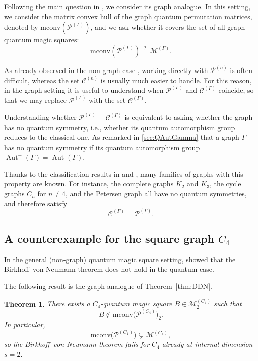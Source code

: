 \documentclass[11pt, a4paper]{article}
\theoremstyle{plain}
\newtheorem{theorem}{Theorem}[section]
\theoremstyle{definition}
\theoremstyle{remark}
\newcommand{\cM}{\mathcal{M}} \newcommand{\cN}{\mathcal{N}} \newcommand{\cO}{\mathcal{O}}
\newcommand{\cP}{\mathcal{P}} \newcommand{\cQ}{\mathcal{Q}} \newcommand{\cR}{\mathcal{R}}
\newcommand{\cPn}{\mathcal{P}^{(n)}}
\newcommand{\cCn}{\mathcal{C}^{(n)}}
\newcommand{\cMG}{\mathcal{M}^{(\Gamma)}}
\newcommand{\cPG}{\mathcal{P}^{(\Gamma)}}
\newcommand{\cCG}{\mathcal{C}^{(\Gamma)}}
\DeclareMathOperator{\Aut}{Aut}
\begin{document}
Following the main question in \cite{DDN20}, we consider its graph analogue.  
In this setting, we consider the matrix convex hull of the graph quantum permutation matrices, denoted by \(
\mathrm{mconv}(\cPG)\), and we ask whether it covers the set of all graph quantum magic squares:
\[
\mathrm{mconv}(\cPG)\overset{?}{=}\cMG.
\]

As already observed in the non-graph case \cite{DDN20}, working directly with \(\cPn\) is often difficult, whereas the set \(\cCn\) is usually much easier to handle.  
For this reason, in the graph setting it is useful to understand when 
\(\cPG\) and \(\cCG\) coincide, so that we may replace 
\(\cPG\) with the set \(\cCG\).




Understanding whether \(\cPG = \cCG\) is equivalent to asking whether the graph has no quantum symmetry, i.e., whether its quantum automorphism group reduces 
to the classical one. As remarked in \autoref{sec:QAutGamma} that a graph \(\Gamma\) has no quantum symmetry if
its quantum automorphism group \(\Aut^{+}(\Gamma)=\Aut(\Gamma)\).

Thanks to the classification results in \cite{BB07} and \cite{Sch18},
many families of graphs with this property are known. For instance, the complete graphs \(K_2\) 
and \(K_3\), the cycle graphs \(C_n\) for \(n \neq 4\), and the Petersen graph all 
have no quantum symmetries, and therefore satisfy
\[
\cCG = \cPG.
\]

\subsection{A counterexample for the square graph \(C_4\)}\label{sec:counterexample}


In the general (non-graph) quantum magic square setting,
\cite{DDN20} showed that the Birkhoff--von Neumann
theorem does not hold in the quantum case.

The following result is the graph analogue of Theorem~\ref{thm:DDN}.



\begin{theorem}\label{thm:C4-counterexample}
There exists a \(C_4\)-quantum magic square 
\(B \in \cM^{(C_4)}_2\)
such that
\[
B \notin \mathrm{mconv}\!\bigl(\cP^{(C_4)}\bigr)_2.
\]
In particular,
\[
\mathrm{mconv}\!\bigl(\cP^{(C_4)}\bigr)
\subsetneq 
\cM^{(C_4)},
\]
so the Birkhoff--von Neumann theorem fails for \(C_4\) already
at internal dimension \(s=2\).
\end{theorem}
\end{document}
